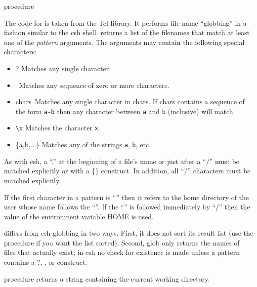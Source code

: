 \begin{entry}{%
 {procedure}}
\saut


The code for  is taken from the Tcl library. It performs
file name ``globbing'' in a fashion similar to the csh shell.
 returns a list of the filenames that match at least one of
the {\em pattern} arguments.  The  arguments may contain
the following special characters:

\begin{itemize}
\item ? Matches any single character.
\item \etoile~Matches any sequence of zero or more characters.
\item {\leftbracket}chars\rightbracket~Matches any single character in chars. 
      If chars contains a sequence of the form {\tt a-b} then any character between
       {\tt a} and {\tt b} (inclusive) will match.
\item  \verb+\+x  Matches the character {\tt x}.
\item \{a,b,...\} Matches any of the strings {\tt a}, {\tt b}, etc.
\end{itemize}

As with csh, a ``.'' at the beginning of a file's name or just after a ``/''
must be matched explicitly or with a \{\} construct.  In addition, all ``/''
characters must be matched explicitly.

If the first character in a pattern is ``{\tilda}'' then it refers to
the home directory of the user whose name follows the ``{\tilda}''.
If the ``{\tilda}'' is followed immediately by ``/'' then the value of
the environment variable HOME is used.

 differs from csh globbing in two ways.  First, it does not
sort its result list (use the  procedure if you want the list sorted).
Second, glob only returns the names of files that actually exist; in csh no
check for existence is made unless a pattern contains a ?, \etoile, or  
\leftbracket\rightbracket
construct.
\end{entry}

\begin{entry}{%
 {procedure}}
\saut
{} returns a string containing the current working directory.
\end{entry}

